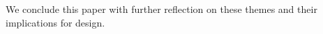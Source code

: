     We conclude this paper with further reflection on these themes and their implications for design.

